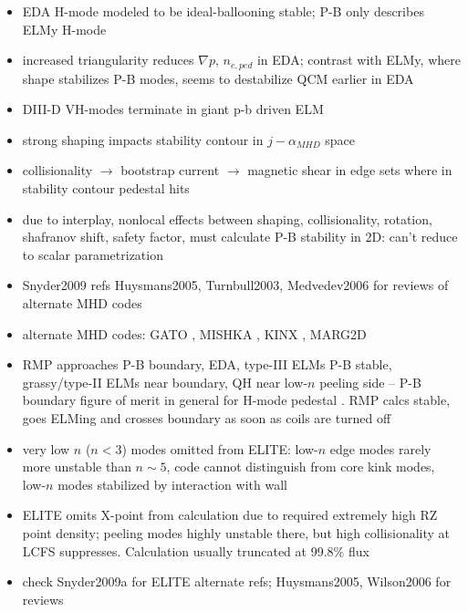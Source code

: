 \begin{itemize}
 \item EDA H-mode modeled to be ideal-ballooning stable; P-B only describes ELMy H-mode \cite{Mossessian2002}
 \item increased triangularity reduces $\nabla p$, $n_{e,ped}$ in EDA; contrast with ELMy, where shape stabilizes P-B modes, seems to destabilize QCM earlier in EDA \cite{Hughes2007a}
 \item DIII-D VH-modes terminate in giant p-b driven ELM \cite{Turnbull2003}
 \item strong shaping impacts stability contour in $j-\alpha_{MHD}$ space \cite{Snyder2009}
 \item collisionality $\rightarrow$ bootstrap current $\rightarrow$ magnetic shear in edge sets where in stability contour pedestal hits \cite{Snyder2009}
 \item due to interplay, nonlocal effects between shaping, collisionality, rotation, shafranov shift, safety factor, must calculate P-B stability in 2D: can't reduce to scalar parametrization \cite{Snyder2009}
 \item Snyder2009 refs Huysmans2005, Turnbull2003, Medvedev2006 \cite{Huysmans2005,Turnbull2003,Medvedev2006} for reviews of alternate MHD codes
 \item alternate MHD codes: GATO \cite{Bernard1981}, MISHKA \cite{Huysmans2001,Mikhailovskii1997}, KINX \cite{Degtyarev1997,Medvedev2006}, MARG2D \cite{Aiba2006,Aiba2007}
 \item RMP approaches P-B boundary, EDA, type-III ELMs P-B stable, grassy/type-II ELMs near boundary, QH near low-$n$ peeling side -- P-B boundary figure of merit in general for H-mode pedestal \cite{Snyder2009}.  RMP calcs stable, goes ELMing and crosses boundary as soon as coils are turned off \cite{Snyder2009a}
 \item very low $n$ ($n < 3$) modes omitted from ELITE: low-$n$ edge modes rarely more unstable than $n \sim 5$, code cannot distinguish from core kink modes, low-$n$ modes stabilized by interaction with wall \cite{Snyder2009}
 \item ELITE omits X-point from calculation due to required extremely high RZ point density; peeling modes highly unstable there, but high collisionality at LCFS suppresses.  Calculation usually truncated at 99.8\% flux \cite{Snyder2009a}
 \item check Snyder2009a for ELITE alternate refs; Huysmans2005, Wilson2006 for reviews \cite{Snyder2009a,Huysmans2005,Wilson2006}
\end{itemize}

